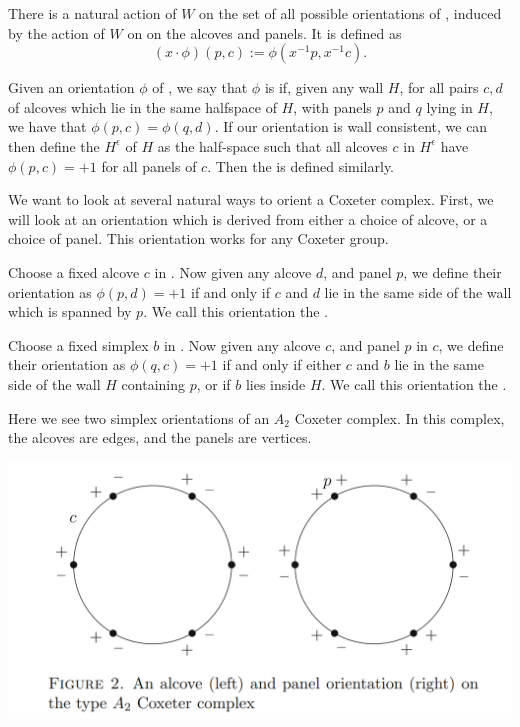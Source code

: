 \documentclass[11pt]{article}
\begin{document}
There is a natural action of $W$ on the set of all possible orientations of \sg, induced by the action of $W$ on on the alcoves and panels. It is defined as 
\[(x\cdot\phi)(p,c):=\phi(x^{-1}p,x^{-1}c).\]

\begin{definition}
    Given an orientation $\phi$ of \sg, we say that $\phi$ is  if, given any wall $H$, for all pairs $c,d$ of alcoves which lie in the same halfspace of $H$, with panels $p$ and $q$ lying in $H$, we have that $\phi(p,c)=\phi(q,d)$. If our orientation is wall consistent, we can then define the  $H^{\epsilon}$ of $H$ as the half-space such that all alcoves $c$ in $H^{\epsilon}$ have $\phi(p,c)=+1$ for all panels of $c$. Then the  is defined similarly.
\end{definition}

We want to look at several natural ways to orient a Coxeter complex. First, we will look at an orientation which is derived from either a choice of alcove, or a choice of panel. This orientation works for any Coxeter group.

\begin{definition}
    Choose a fixed alcove $c$ in \sg. Now given any alcove $d$, and panel $p$, we define their orientation as $\phi(p,d)=+1$ if and only if $c$ and $d$ lie in the same side of the wall which is spanned by $p$. We call this orientation the .
\end{definition}


\begin{definition}
    Choose a fixed simplex $b$ in \sg. Now given any alcove $c$, and panel $p$ in $c$, we define their orientation as $\phi(q,c)=+1$ if and only if either $c$ and $b$ lie in the same side of the wall $H$ containing $p$, or if $b$ lies inside $H$. We call this orientation the .
\end{definition}
\begin{example}
    Here we see two simplex orientations of an $A_2$ Coxeter complex. In this complex, the alcoves are edges, and the panels are vertices.
\end{example}
\includegraphics[scale=0.6]{Screenshot 2023-02-03 102201.png}\\
\end{document}
